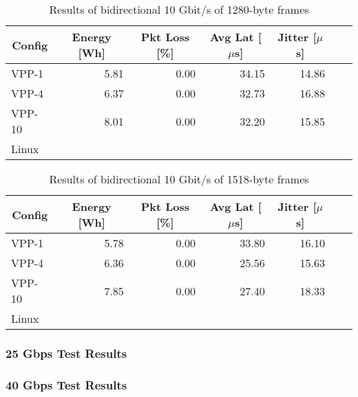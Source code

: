 \begin{table}[h!]
\centering
\caption{Results of bidirectional 10 Gbit/s of 1280-byte frames}
\begin{tabular}{|l|r|r|r|r|r|r|}
\hline
\multicolumn{1}{|c|}{\textbf{Config}} &
\multicolumn{1}{c|}{\textbf{Energy [Wh] }} &
\multicolumn{1}{c|}{\textbf{Pkt Loss [\%]}} &
\multicolumn{1}{c|}{\textbf{Avg Lat [$\mu$s]}} &
\multicolumn{1}{c|}{\textbf{Jitter [$\mu$s]}} \\
\hline 
VPP-1 & 5.81 & 0.00 & 34.15 & 14.86 \\
VPP-4 & 6.37 & 0.00 & 32.73 & 16.88 \\
VPP-10 & 8.01 & 0.00 & 32.20 & 15.85 \\
Linux &  &  &  &  \\
\hline
\end{tabular}
\label{tab:10budp:1280B}
\end{table}

\begin{table}[h!]
\centering
\caption{Results of bidirectional 10 Gbit/s of 1518-byte frames}
\begin{tabular}{|l|r|r|r|r|r|r|}
\hline
\multicolumn{1}{|c|}{\textbf{Config}} &
\multicolumn{1}{c|}{\textbf{Energy [Wh] }} &
\multicolumn{1}{c|}{\textbf{Pkt Loss [\%]}} &
\multicolumn{1}{c|}{\textbf{Avg Lat [$\mu$s]}} &
\multicolumn{1}{c|}{\textbf{Jitter [$\mu$s]}} \\
\hline 
VPP-1 & 5.78 & 0.00 & 33.80 & 16.10 \\
VPP-4 & 6.36 & 0.00 & 25.56 & 15.63 \\
VPP-10 & 7.85 & 0.00 & 27.40 & 18.33 \\
Linux &  &  &  &  \\
\hline
\end{tabular}
\label{tab:10budp:1518B}
\end{table}


\subsubsection{25 Gbps Test Results}



\subsubsection{40 Gbps Test Results}



